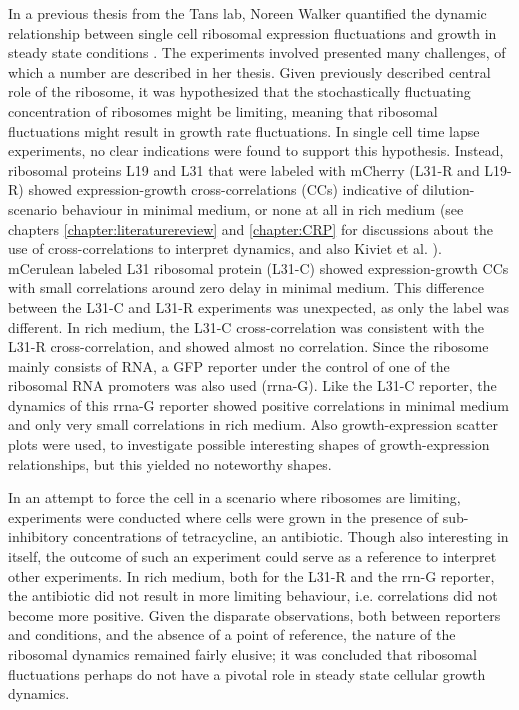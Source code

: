 In a previous thesis from the Tans lab, Noreen Walker 
quantified the dynamic relationship between single cell ribosomal expression fluctuations and growth in steady state conditions \cite{Walker2016t}.
%
The experiments involved presented many challenges, 
of which a number are described in her thesis.
%
%
Given previously described central role of the ribosome, 
it was hypothesized that the stochastically fluctuating concentration of ribosomes might be limiting, 
meaning that ribosomal fluctuations might result in growth rate fluctuations.
%
In single cell time lapse experiments, no clear indications were found to support this hypothesis.
%
Instead, 
ribosomal proteins L19 and L31 that were labeled with mCherry (L31-R and L19-R)
showed expression-growth cross-correlations (CCs) indicative of dilution-scenario behaviour in minimal medium, or none at all in rich medium (see chapters \ref{chapter:literaturereview} and \ref{chapter:CRP} for discussions about the use of cross-correlations to interpret dynamics, and also Kiviet et al. \cite{Kiviet2014}). 
mCerulean labeled L31 ribosomal protein (L31-C) showed expression-growth CCs with small correlations around zero delay 
in minimal medium.
This difference between the L31-C and L31-R experiments was unexpected, as only the label was different.
%
In rich medium, the L31-C cross-correlation was consistent with the L31-R cross-correlation, and showed almost no correlation.
%
Since the ribosome mainly consists of RNA, 
a GFP reporter under the control of one of the ribosomal RNA promoters was also used (rrna-G).
Like the L31-C reporter, the dynamics of this rrna-G reporter showed positive correlations in minimal medium and only very small correlations in rich medium.
%
Also growth-expression scatter plots were used, to investigate possible interesting shapes of growth-expression relationships, but this yielded no noteworthy shapes.

In an attempt to force the cell in a scenario where ribosomes are limiting, experiments were conducted where cells were grown in the presence of sub-inhibitory concentrations of tetracycline, an antibiotic.
%
Though also interesting in itself, the outcome of such an experiment could serve as a reference to interpret other experiments.
%
In rich medium, both for the L31-R and the rrn-G reporter, the antibiotic did not result in more limiting behaviour, i.e. correlations did not become more positive.
%
Given the disparate observations, both between reporters and conditions, 
and the absence of a point of reference,
the nature of the ribosomal dynamics remained fairly elusive; it was concluded that ribosomal fluctuations perhaps do not have a pivotal role in steady state cellular growth dynamics.

